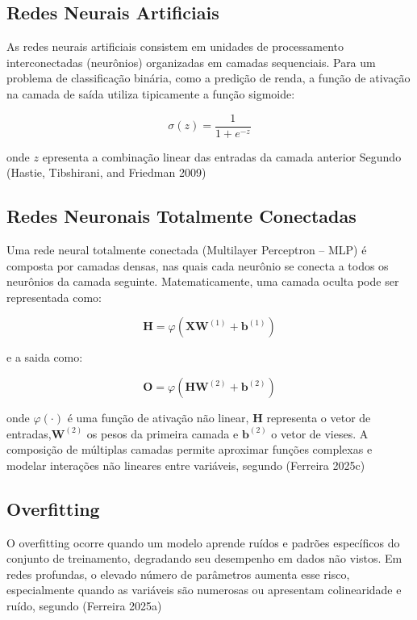 \documentclass[
  oneclumn]{article}
\begin{document}
\subsection{Redes Neurais Artificiais}\label{redes-neurais-artificiais}

As redes neurais artificiais consistem em unidades de processamento
interconectadas (neurônios) organizadas em camadas sequenciais. Para um
problema de classificação binária, como a predição de renda, a função de
ativação na camada de saída utiliza tipicamente a função sigmoide:

\[\sigma(z) = \frac{1}{1 + e^{-z}}\]

onde \(z\) epresenta a combinação linear das entradas da camada anterior
Segundo (Hastie, Tibshirani, and Friedman 2009)

\subsection{Redes Neuronais Totalmente
Conectadas}\label{redes-neuronais-totalmente-conectadas}

Uma rede neural totalmente conectada (Multilayer Perceptron -- MLP) é
composta por camadas densas, nas quais cada neurônio se conecta a todos
os neurônios da camada seguinte. Matematicamente, uma camada oculta pode
ser representada como:

\[
\mathbf{H} = \varphi(\mathbf{X}\mathbf{W}^{(1)} + \mathbf{b}^{(1)})
\]

e a saida como:

\[
\mathbf{O} = \varphi(\mathbf{H}\mathbf{W}^{(2)} + \mathbf{b}^{(2)})
\]

onde \(\varphi(\cdot)\) é uma função de ativação não linear,
\(\mathbf{H}\) representa o vetor de entradas,\(\mathbf{W}^{(2)}\) os
pesos da primeira camada e \(\mathbf{b}^{(2)}\) o vetor de vieses. A
composição de múltiplas camadas permite aproximar funções complexas e
modelar interações não lineares entre variáveis, segundo (Ferreira
2025c)

\subsection{Overfitting}\label{overfitting}

O overfitting ocorre quando um modelo aprende ruídos e padrões
específicos do conjunto de treinamento, degradando seu desempenho em
dados não vistos. Em redes profundas, o elevado número de parâmetros
aumenta esse risco, especialmente quando as variáveis são numerosas ou
apresentam colinearidade e ruído, segundo (Ferreira 2025a)
\end{document}
